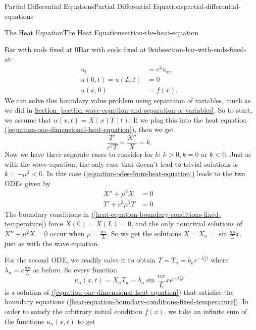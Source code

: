 \documentclass[oneside,10pt,]{book}
\numberwithin{equation}{section}
\newcommand{\lt}{<}
\newcommand{\gt}{>}
\newcommand{\amp}{&}
\begin{document}
\begin{chapterptx}{Partial Differential Equations}{}{Partial Differential Equations}{}{}{partial-differential-equations}
\begin{sectionptx}{The Heat Equation}{}{The Heat Equation}{}{}{section-the-heat-equation}
\begin{subsectionptx}{Bar with ends fixed at \(0\)}{}{Bar with ends fixed at \(0\)}{}{}{subsection-bar-with-ends-fixed-at-}
%
\begin{align}
u_{t} \amp = c^{2}u_{xx} \label{equation-one-dimensional-heat-equation}\\
u(0,t) = u(L,t) \amp = 0 \label{heat-equation-boundary-conditions-fixed-temperature}\\
u(x,0) \amp = f(x) \text{.}\label{heat-equation-initial-condition}
\end{align}
\hypertarget{p-690}{}%
We can solve this boundary value problem using separation of variables, much as we did in \hyperref[section-wave-equation-and-separation-of-variables]{Section~\ref{section-wave-equation-and-separation-of-variables}}. So to start, we assume that \(u(x,t) = X(x)T(t)\). If we plug this into the heat equation \hyperref[equation-one-dimensional-heat-equation]{(\ref{equation-one-dimensional-heat-equation})}, then we get%
%
\begin{equation}
\frac{T'}{c^{2}T} = \frac{X''}{X} = k.\label{equation-odes-from-heat-equation}
\end{equation}
\hypertarget{p-691}{}%
Now we have three separate cases to consider for \(k\): \(k\gt0, k=0\) or \(k\lt0\). Just as with the wave equation, the only case that doesn't lead to trivial solutions is \(k=-\mu^{2}\lt0\). In this case \hyperref[equation-odes-from-heat-equation]{(\ref{equation-odes-from-heat-equation})} leads to the two ODEs given by%
%
\begin{align*}
X''+\mu^{2}X \amp = 0 \\
T'+c^{2}\mu^{2}T \amp = 0 \text{.}
\end{align*}
\hypertarget{p-692}{}%
The boundary conditions in \hyperref[heat-equation-boundary-conditions-fixed-temperature]{(\ref{heat-equation-boundary-conditions-fixed-temperature})} force \(X(0) = X(L) = 0\), and the only nontrivial solutions of \(X''+\mu^{2}X = 0\) occur when \(\mu = \frac{n\pi}{L}\). So we get the solutions \(X = X_{n} = \sin\frac{n\pi}{L}x\), just as with the wave equation.%
\par
\hypertarget{p-693}{}%
For the second ODE, we readily solve it to obtain \(T = T_{n} = b_{n}e^{-\lambda_{n}^{2}t}\) where \(\lambda_{n} = c\frac{n\pi}{L}\) as before. So every function%
\begin{equation*}
u_{n}(x,t) = X_{n}T_{n} = b_{n}\sin\frac{n\pi}{L}xe^{-\lambda_{n}^{2}t}
\end{equation*}
is a solution of \hyperref[equation-one-dimensional-heat-equation]{(\ref{equation-one-dimensional-heat-equation})} that satisfies the boundary equations \hyperref[heat-equation-boundary-conditions-fixed-temperature]{(\ref{heat-equation-boundary-conditions-fixed-temperature})}. In order to satisfy the arbitrary initial condition \(f(x)\), we take an infinite sum of the functions \(u_{n}(x,t)\) to get%

\end{subsectionptx}
\end{sectionptx}
\end{chapterptx}
\end{document}
